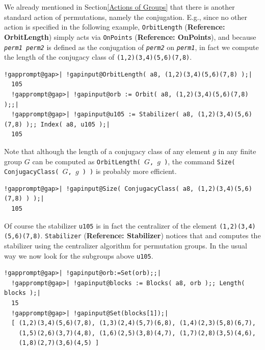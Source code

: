 \documentclass[a4paper,11pt]{report}
\begin{document}
{{ We already mentioned in Section{\nobreakspace}\ref{Actions of Groups} that there is another standard action of permutations, namely the conjugation.
E.g., since no other action is specified in the following example, \texttt{OrbitLength} (\textbf{Reference: OrbitLength}) simply acts via \texttt{OnPoints} (\textbf{Reference: OnPoints}), and because \mbox{\texttt{\mdseries\slshape perm{\textunderscore}1}}\texttt{ \texttt{} }\mbox{\texttt{\mdseries\slshape perm{\textunderscore}2}} is defined as the conjugation of \mbox{\texttt{\mdseries\slshape perm{\textunderscore}2}} on \mbox{\texttt{\mdseries\slshape perm{\textunderscore}1}}, in fact we compute the length of the conjugacy class of \texttt{(1,2)(3,4)(5,6)(7,8)}. 

 
\begin{Verbatim}[commandchars=!@|,fontsize=\small,frame=single,label=Example]
  !gapprompt@gap>| !gapinput@OrbitLength( a8, (1,2)(3,4)(5,6)(7,8) );|
  105
  !gapprompt@gap>| !gapinput@orb := Orbit( a8, (1,2)(3,4)(5,6)(7,8) );;|
  !gapprompt@gap>| !gapinput@u105 := Stabilizer( a8, (1,2)(3,4)(5,6)(7,8) );; Index( a8, u105 );|
  105
\end{Verbatim}
 

 Note that although the length of a conjugacy class of any element $g$ in any finite group $G$ can be computed as \texttt{OrbitLength( }$G$\texttt{, }$g$\texttt{ )}, the command \texttt{Size( ConjugacyClass( }$G$\texttt{, }$g$\texttt{ ) )} is probably more efficient. 

 
\begin{Verbatim}[commandchars=!@|,fontsize=\small,frame=single,label=Example]
  !gapprompt@gap>| !gapinput@Size( ConjugacyClass( a8, (1,2)(3,4)(5,6)(7,8) ) );|
  105
\end{Verbatim}
 

 Of course the stabilizer \texttt{u105} is in fact the centralizer of the element \texttt{(1,2)(3,4)(5,6)(7,8)}. \texttt{Stabilizer} (\textbf{Reference: Stabilizer}) notices that and computes the stabilizer using the centralizer algorithm for
permutation groups. In the usual way we now look for the subgroups above \texttt{u105}. 

 
\begin{Verbatim}[commandchars=!@|,fontsize=\small,frame=single,label=Example]
  !gapprompt@gap>| !gapinput@orb:=Set(orb);;|
  !gapprompt@gap>| !gapinput@blocks := Blocks( a8, orb );; Length( blocks );|
  15
  !gapprompt@gap>| !gapinput@Set(blocks[1]);|
  [ (1,2)(3,4)(5,6)(7,8), (1,3)(2,4)(5,7)(6,8), (1,4)(2,3)(5,8)(6,7),
    (1,5)(2,6)(3,7)(4,8), (1,6)(2,5)(3,8)(4,7), (1,7)(2,8)(3,5)(4,6),
    (1,8)(2,7)(3,6)(4,5) ]
\end{Verbatim}
 

}}
\end{document}
